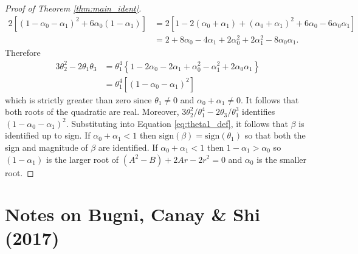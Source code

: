 \documentclass[12pt]{article}
\begin{document}
\begin{proof}[Proof of Theorem \ref{thm:main_ident}]
  \begin{align*}
    2\left[ (1 - \alpha_0 - \alpha_1)^2 + 6\alpha_0(1 - \alpha_1) \right]
  &=2\left[ 1 - 2(\alpha_0 + \alpha_1) + (\alpha_0 + \alpha_1)^2 + 6\alpha_0 - 6 \alpha_0 \alpha_1 \right]\\
    &= 2 + 8\alpha_0 - 4\alpha_1 + 2\alpha_0^2 +  2\alpha_1^2 - 8 \alpha_0 \alpha_1.
  \end{align*}
Therefore
  \begin{align*}
    3\theta^2_2 - 2\theta_1 \theta_3 
    &= \theta_1^4 \left\{ 1 - 2 \alpha_0 - 2 \alpha_1 + \alpha_0^2 - \alpha_1^2 + 2\alpha_0 \alpha_1 \right\}\\
    &= \theta_1^4 \left[ (1 - \alpha_0 - \alpha_1)^2 \right]
  \end{align*}
which is strictly greater than zero since $\theta_1 \neq 0$ and $\alpha_0 + \alpha_1 \neq 0$.
It follows that both roots of the quadratic are real.
Moreover, $3\theta_2^2/\theta_1^4 - 2\theta_3/\theta_1^3$ identifies $(1 - \alpha_0 - \alpha_1)^2$.
Substituting into Equation \ref{eq:theta1_def}, it follows that $\beta$ is identified up to sign.
If $\alpha_0 + \alpha_1 < 1$ then $\mbox{sign}(\beta) = \mbox{sign}(\theta_1)$ so that both the sign and magnitude of $\beta$ are identified.
If $\alpha_0 + \alpha_1 < 1$ then $1 - \alpha_1 > \alpha_0$ so $(1 - \alpha_1)$ is the larger root of $(A^2 - B) + 2Ar - 2r^2=0$ and $\alpha_0$ is the smaller root.
\end{proof}

\section{Notes on Bugni, Canay \& Shi (2017)}

\end{document}
